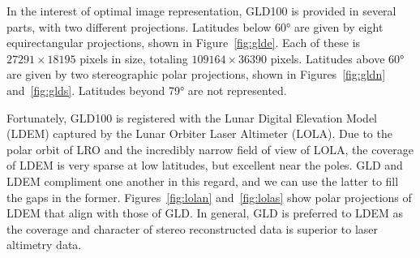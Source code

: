 \documentclass[oneside,10pt]{memoir}
\begin{document}
\begin{Spacing}{1.1}
In the interest of optimal image representation, GLD100 is provided in several parts, with two different projections. Latitudes below \ang{60} are given by eight equirectangular projections, shown in Figure~\ref{fig:glde}. Each of these is $\num{27291}\times\num{18195}$ pixels in size, totaling $\num{109164}\times\num{36390}$ pixels. Latitudes above \ang{60} are given by two stereographic polar projections, shown in Figures~\ref{fig:gldn} and~\ref{fig:glds}. Latitudes beyond \ang{79} are not represented.

Fortunately, GLD100 is registered with the Lunar Digital Elevation Model (LDEM) captured by the Lunar Orbiter Laser Altimeter (LOLA). Due to the polar orbit of LRO and the incredibly narrow field of view of LOLA, the coverage of LDEM is very sparse at low latitudes, but excellent near the poles. GLD and LDEM compliment one another in this regard, and we can use the latter to fill the gaps in the former. Figures~\ref{fig:lolan} and~\ref{fig:lolas} show polar projections of LDEM that align with those of GLD. In general, GLD is preferred to LDEM as the coverage and character of stereo reconstructed data is superior to laser altimetry data.


\end{Spacing}
\end{document}
